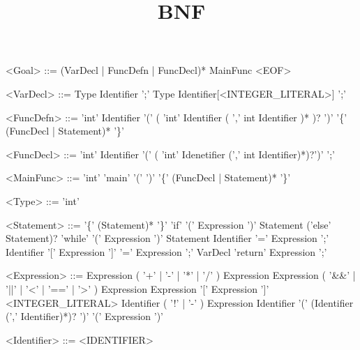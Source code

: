 \documentclass{article}
\title{BNF}
\begin{document}
\setlength{\grammarindent}{8em} %
\begin{grammar}
<Goal> ::= (VarDecl | FuncDefn | FuncDecl)* MainFunc <EOF>

<VarDecl> ::= Type Identifier ';'
\alt Type Identifier[<INTEGER_LITERAL>] ';'

<FuncDefn>  ::= 'int' Identifier '(' ( 'int' Identifier ( ',' int Identifier )* )? ')' '\{' (FuncDecl | Statement)* '\}'

<FuncDecl> ::= 'int' Identifier '(' ( 'int' Idenetifier (',' int Identifier)*)?')' ';'

<MainFunc> ::= 'int' 'main' '(' ')' '\{' (FuncDecl | Statement)* '\}'

<Type> ::= 'int'

<Statement> ::= '\{' (Statement)* '\}'
\alt 'if' '(' Expression ')' Statement ('else' Statement)?
\alt 'while' '(' Expression ')' Statement
\alt Identifier '=' Expression ';'
\alt Identifier '[' Expression ']' '=' Expression ';'
\alt VarDecl
\alt 'return' Expression ';'

<Expression>	::=	Expression ( '+' | '-' | '*' | '/' ) Expression
\alt Expression ( '\&\&' | '||' | '<' | '==' | '>' ) Expression
\alt Expression '[' Expression ']'
\alt <INTEGER_LITERAL>
\alt Identifier
\alt ( '!' | '-' ) Expression
\alt Identifier '(' (Identifier (',' Identifier)*)? ')'
\alt '(' Expression ')'


<Identifier>	::=	<IDENTIFIER>


\end{grammar}
\end{document}
